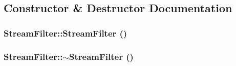 \subsection{Constructor \& Destructor Documentation}
\hypertarget{classyarp_1_1os_1_1_stream_filter_a687a3082652cb3163619fa04bfe9db1f}{
\subsubsection[{StreamFilter}]{\setlength{\rightskip}{0pt plus 5cm}StreamFilter::StreamFilter ()}}
\label{classyarp_1_1os_1_1_stream_filter_a687a3082652cb3163619fa04bfe9db1f}
\hypertarget{classyarp_1_1os_1_1_stream_filter_a39cc5195a93b8146c2f9117298f97581}{
\subsubsection[{$\sim$StreamFilter}]{\setlength{\rightskip}{0pt plus 5cm}StreamFilter::$\sim$StreamFilter ()}}
\label{classyarp_1_1os_1_1_stream_filter_a39cc5195a93b8146c2f9117298f97581}


